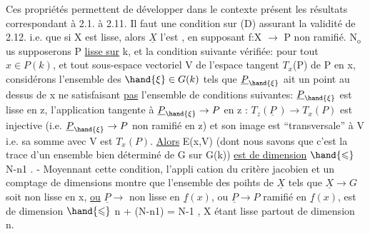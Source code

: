 Ces propriétés permettent de développer dans le contexte présent
les résultats correspondant à 2.1. à 2.11. Il faut une condition sur (D)
assurant la validité de 2.12. i.e. que si X est lisse, alors $\underline{X}$ l'est
, en supposant f:X $\longrightarrow$ P non ramifié. N$_{\mathrm{o}}$us supposerons
 P \uline{lisse sur} k, et la condition suivante vérifiée: pour
tout $x \in P(k)$, et tout sous-espace vectoriel V  de l'espace tangent
$T_x$(P) de P en x, considérons l'ensemble  des $\hand{\xi} \in G(k)$ tels que
$\underline{P}_{\hand{\xi}}$ ait un point au dessus de x 
ne satisfaisant \uline{pas} l'ensemble de conditions suivantes: $\underline{P}_{\hand{\xi}}$ est lisse en
z, 
l'application tangente à $\underline{P}_{\hand{\xi}} \rightarrow P$ en z : $T_z(\underline{P}\ ) \rightarrow T_x(P)$ est injective
(i.e. $\underline{P}_{\hand{\xi}} \rightarrow P$ non ramifié en z) et son image est ``transversale'' à V
i.e. sa somme avec V est $T_x(P)$. \uline{Alors} E(x,V) (dont nous savons que
c'est la trace d'un ensemble   bien déterminé de G sur G(k))
\uline{est de dimension} $\hand{\leqslant}$ N-n1 . - Moyennant cette condition,  l'appli\unsure{:}
cation du critère jacobien et un comptage de dimensions montre que
l'ensemble des poihts de $\underline{X}$ tels que $\underline{X} \longrightarrow G$ soit non lisse en x, \uline{ou}
$\underline{P} \longrightarrow$  non lisse en $\underline{f}(x)$, ou $\underline{P} \longrightarrow P$ ramifié en $\underline{f}(x)$, est de
dimension $\hand{\leqslant}$ n + (N-n1) = N-1 , \hand{(}X étant lisse partout de dimension n\hand{)}.

